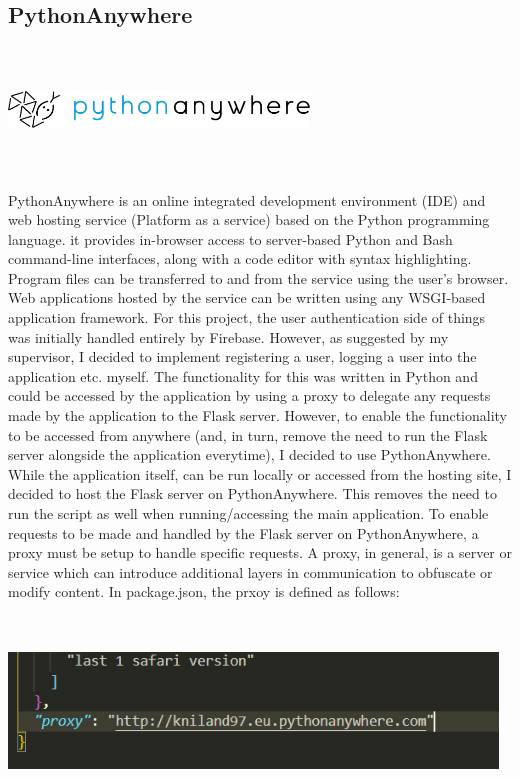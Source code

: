 \newpage
\subsection{PythonAnywhere}
\par
\medskip
\begin{center}
    \includegraphics[width=8cm,height=3.3cm,keepaspectratio]{images/pythonanywhere}
\end{center}
PythonAnywhere is an online integrated development environment (IDE) and web
hosting service (Platform as a service) based on the Python programming 
language. it provides in-browser access to server-based Python and Bash 
command-line interfaces, along with a code editor with syntax highlighting. 
Program files can be transferred to and from the service using the user's 
browser. Web applications hosted by the service can be written using any 
WSGI-based application framework. For this project, the user authentication side
of things was initially handled entirely by Firebase. However, as suggested by 
my supervisor, I decided to implement registering a user, logging a user into 
the application etc. myself. The functionality for this was written in Python 
and could be accessed by the application by using a proxy to delegate any 
requests made by the application to the Flask server. However, to enable the 
functionality to be accessed from anywhere (and, in turn, remove the need to run
the Flask server alongside the application everytime), I decided to use 
PythonAnywhere. While the application itself, can be run locally or accessed from the hosting site, I decided to host the Flask server on PythonAnywhere. This removes the need to run the script as well when running/accessing the main application. To enable requests to be made and handled by the Flask server on PythonAnywhere, a proxy must be setup to handle specific requests. A proxy, in general, is a server or service which can introduce additional layers in communication to obfuscate or modify content. In package.json, the prxoy is defined as follows:

\begin{center}
    \includegraphics[width=13cm,height=5cm,keepaspectratio]{images/packagejson}
\end{center}

